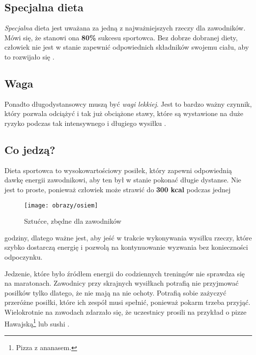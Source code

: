 \documentclass[12pt]{article}
\begin{document}
\subsection{Specjalna dieta}
\noindent \emph{Specjalna} dieta jest uważana za jedną z najważniejszych rzeczy dla zawodników. Mówi się, że stanowi ona \textbf{ 80\%} sukcesu sportowca. Bez dobrze dobranej diety, człowiek nie jest w stanie zapewnić odpowiednich składników swojemu ciału, aby to rozwijało się \cite{watzlawik83}.

\subsection{Waga}
\noindent Ponadto długodystansowcy muszą być \textit{wagi lekkiej}. Jest to bardzo ważny czynnik, który pozwala odciążyć i tak już obciążone stawy, które są wystawione na duże ryzyko podczas tak intensywnego i długiego wysiłku \cite{lukruz20}.
\subsection{Co jedzą?}

\noindent Dieta sportowca to wysokowartościowy posiłek, który zapewni odpowiednią dawkę energii zawodnikowi, aby ten był w stanie pokonać długie dystanse. Nie jest to proste, ponieważ człowiek może strawić do \textbf{300 kcal} podczas jednej\begin{wrapfigure}{r}{0.5\textwidth}
\begin{center}
\vspace{-20pt}
\texttt{[image: obrazy/osiem]}
\end{center}
\vspace{-20pt}
\caption{{\scriptsize Sztućce, zbędne dla zawodników}}
\vspace{-10pt}
\end{wrapfigure}
 godziny, dlatego ważne jest, aby jeść w trakcie wykonywania wysiłku rzeczy, które szybko dostarczą energię i pozwolą na kontynuowanie wyzwania bez konieczności odpoczynku.

Jedzenie, które było źródłem energii do codziennych treningów nie sprawdza się na maratonach. Zawodnicy przy skrajnych wysiłkach potrafią nie przyjmować posiłków tylko dlatego, że nie mają na nie ochoty. Potrafią sobie zażyczyć przeróżne posiłki, które ich zespół musi spełnić, ponieważ pokarm trzeba przyjąć. Wielokrotnie na zawodach zdarzało się, że uczestnicy prosili na przykład o pizze Hawajską\footnote{Pizza z ananasem.} lub sushi \cite{aumann1992handbook}.
	 
\end{document}
